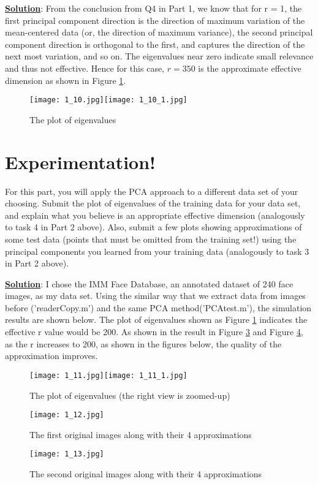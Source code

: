 \documentclass[12pt, letterpaper]{article}
\begin{document}
\textbf{\underline{Solution}}: From the conclusion from Q4 in Part 1, we know that for r = 1, the first principal component direction is the direction of maximum variation of the mean-centered data (or, the direction of maximum variance), the second principal component direction is orthogonal to the first, and captures the direction of the next most variation, and so on. The eigenvalues near zero indicate small relevance and thus not effective. Hence for this case, $r=350$ is the approximate effective dimension as shown in Figure \ref{fig:1_10}.

\begin{figure}[h]
  \centering
  \texttt{[image: 1\_10.jpg]}\texttt{[image: 1\_10\_1.jpg]}
  \caption{The plot of eigenvalues}
  \label{fig:1_10}
\end{figure}

\section{Experimentation!}
For this part, you will apply the PCA approach to a different data set of your choosing. Submit the plot of eigenvalues of the training data for your data set, and explain what you believe is an appropriate effective dimension (analogously to task 4 in Part 2 above). Also, submit a few plots showing approximations of some test data (points that must be omitted from the training set!) using the principal components you learned from your training data (analogously to task 3 in Part 2 above).


\textbf{\underline{Solution}}: I chose the IMM Face Database\cite{IMM2004-03160}, an annotated dataset of 240 face images, as my data set. Using the similar way that we extract data from images before ('readerCopy.m') and the same PCA method('PCAtest.m'), the simulation results are shown below. 
The plot of eigenvalues shown as Figure \ref{fig:1_10} indicates the  effective r value would be 200. As shown in the result in Figure \ref{fig:1_12} and Figure \ref{fig:1_13}, as the r increases to 200, as shown in the figures below, the quality of the approximation improves.  


\begin{figure}[h]
  \centering
  \texttt{[image: 1\_11.jpg]}\texttt{[image: 1\_11\_1.jpg]}
  \caption{The plot of eigenvalues (the right view is zoomed-up)}
  \label{fig:1_11}
\end{figure}

\begin{figure}[h]
  \centering
  \texttt{[image: 1\_12.jpg]}
  \caption{The first original images along with their 4 approximations}
  \label{fig:1_12}
\end{figure}

\begin{figure}[h]
  \centering
  \texttt{[image: 1\_13.jpg]}
  \caption{The second original images along with their 4 approximations}
  \label{fig:1_13}
\end{figure}

\section*{}







 
\end{document}
